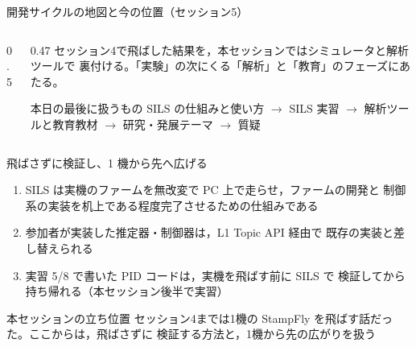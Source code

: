 
\providecommand{\scisessionmap}[1]{}

\begin{frame}{開発サイクルの地図と今の位置（セッション5）}
  \begin{columns}[T]
    \begin{column}{0.5\textwidth}
      \centering
      \resizebox{\columnwidth}{!}{\scisessionmap{5}}
    \end{column}
    \begin{column}{0.47\textwidth}
      \small
      セッション4で飛ばした結果を，本セッションではシミュレータと解析ツールで
      裏付ける。「実験」の次にくる「解析」と「教育」のフェーズにあたる。

      \vspace{0.5em}

      \begin{block}{本日の最後に扱うもの}
        \footnotesize
        SILS の仕組みと使い方 $\to$ SILS 実習 $\to$ 解析ツールと教育教材 $\to$
        研究・発展テーマ $\to$ 質疑
      \end{block}
    \end{column}
  \end{columns}
\end{frame}

\begin{frame}{飛ばさずに検証し、1 機から先へ広げる}
  \begin{enumerate}
    \item SILS は実機のファームを無改変で PC 上で走らせ，ファームの開発と
          制御系の実装を机上である程度完了させるための仕組みである
    \item 参加者が実装した推定器・制御器は，L1 Topic API 経由で
          既存の実装と差し替えられる
    \item 実習 5/8 で書いた PID コードは，実機を飛ばす前に SILS で
          検証してから持ち帰れる（本セッション後半で実習）
  \end{enumerate}

  \vspace{0.5em}

  \begin{alertblock}{本セッションの立ち位置}
    \small
    セッション4までは1機の StampFly を飛ばす話だった。ここからは，飛ばさずに
    検証する方法と，1機から先の広がりを扱う
  \end{alertblock}
\end{frame}



